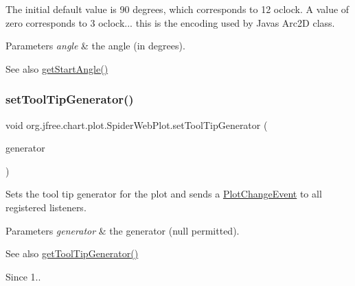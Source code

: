 The initial default value is 90 degrees, which corresponds to 12 o\textquotesingle{}clock. A value of zero corresponds to 3 o\textquotesingle{}clock... this is the encoding used by Java\textquotesingle{}s Arc2D class.


\begin{DoxyParams}{Parameters}
{\em angle} & the angle (in degrees).\\
\hline
\end{DoxyParams}
\begin{DoxySeeAlso}{See also}
\mbox{\hyperlink{classorg_1_1jfree_1_1chart_1_1plot_1_1_spider_web_plot_a5ac40ecb9b44741d1be501a5dfab73c8}{get\+Start\+Angle()}} 
\end{DoxySeeAlso}
\mbox{\label{classorg_1_1jfree_1_1chart_1_1plot_1_1_spider_web_plot_ad4eaa6c6e790c66b4146ee7f0a1fd455}} 
\subsubsection{\texorpdfstring{set\+Tool\+Tip\+Generator()}{setToolTipGenerator()}}
{\footnotesize\ttfamily void org.\+jfree.\+chart.\+plot.\+Spider\+Web\+Plot.\+set\+Tool\+Tip\+Generator (\begin{DoxyParamCaption}\item[{\mbox{\hyperlink{interfaceorg_1_1jfree_1_1chart_1_1labels_1_1_category_tool_tip_generator}{Category\+Tool\+Tip\+Generator}}}]{generator }\end{DoxyParamCaption})}

Sets the tool tip generator for the plot and sends a \mbox{\hyperlink{}{Plot\+Change\+Event}} to all registered listeners.


\begin{DoxyParams}{Parameters}
{\em generator} & the generator ({\ttfamily null} permitted).\\
\hline
\end{DoxyParams}
\begin{DoxySeeAlso}{See also}
\mbox{\hyperlink{classorg_1_1jfree_1_1chart_1_1plot_1_1_spider_web_plot_a265ccacbd0b27a4f909fcbd07e58303b}{get\+Tool\+Tip\+Generator()}}
\end{DoxySeeAlso}
\begin{DoxySince}{Since}
1.. 
\end{DoxySince}
\mbox{\label{classorg_1_1jfree_1_1chart_1_1plot_1_1_spider_web_plot_a8400df465e80c5fb7ba648adaf51bff5}} 
